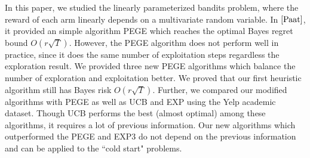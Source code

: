 \documentclass{article}
\theoremstyle{plain}
\theoremstyle{definition}
\begin{document}
In this paper, we studied the linearly parameterized bandits problem, where the reward of each arm linearly depends on a multivariate random variable. In $\cite{Paat}$, it provided an simple algorithm PEGE which reaches the optimal Bayes regret bound $O(r\sqrt{T})$. However, the PEGE algorithm does not perform well in practice, since it does the same number of exploitation steps regardless the exploration result. We provided three new PEGE algorithms which balance the number of exploration and exploitation better. We proved that our first heuristic algorithm still has Bayes risk $O(r\sqrt{T})$. Further, we compared our modified algorithms with PEGE as well as UCB and EXP using the Yelp academic dataset. Though UCB performs the best (almost optimal) among these algorithms, it requires a lot of previous information. Our new algorithms which outperformed the PEGE and EXP3 do not depend on the previous information and can be applied to the ``cold start" problems.


\nocite{langley00}





%
%
%
\end{document}
